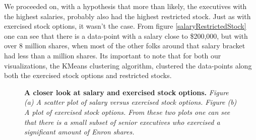 \documentclass[twoside,openright,titlepage,numbers=noenddot,headinclude,%
               footinclude=true,cleardoublepage=empty,abstractoff,BCOR=5mm,%
               paper=a4,fontsize=11pt,ngerman,american]{scrreprt}
\numberwithin{theorem}{chapter}
\numberwithin{definition}{chapter}
\numberwithin{algorithm}{chapter}
\numberwithin{figure}{chapter}
\numberwithin{table}{chapter}
\numberwithin{equation}{chapter}
\begin{document}
We proceeded on, with a hypothesis that more than likely, the executives with the highest salaries, probably also had the highest restricted stock. Just as with exercised stock options, it wasn't the case. From figure \ref{salaryRestrictedStock} one can see that there is a data-point with a salary close to \$200,000, but with over 8 million shares, when most of the other folks around that salary bracket had less than a million shares. Its important to note that for both our visualizations, the KMeans clustering algorithm, clustered the data-points along both the exercised stock options and restricted stocks. 
\begin{figure}[!hbtp]
\centering
    
    \caption{\textbf{A closer look at salary and exercised stock options.} \textit{Figure (a) A scatter plot of salary versus exercised stock options. Figure (b) A plot of exercised stock options. From these two plots one can see that there is a small subset of senior executives who exercised a significant amount of Enron shares. }}
\end{figure}
\end{document}
